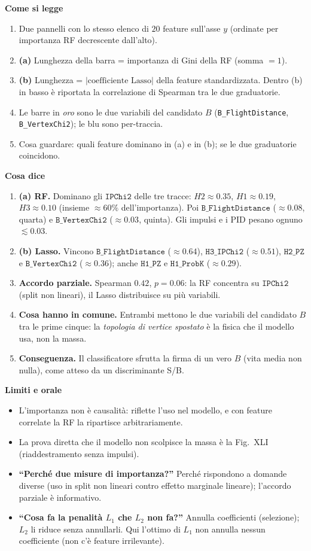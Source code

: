 \documentclass[10.5pt,a4paper]{article}
\newcommand{\sez}[1]{\par\Needspace{6\baselineskip}\medskip\noindent\textbf{\large #1}\par\nopagebreak\smallskip}
\begin{document}
\sez{Come si legge}
\begin{enumerate}
\item Due pannelli con lo stesso elenco di $20$ feature sull'asse $y$ (ordinate per importanza RF decrescente dall'alto).
\item \textbf{(a)} Lunghezza della barra = importanza di Gini della RF (somma $=1$).
\item \textbf{(b)} Lunghezza = $|\text{coefficiente Lasso}|$ della feature standardizzata. Dentro (b) in basso è riportata la correlazione di Spearman tra le due graduatorie.
\item Le barre in \emph{oro} sono le due variabili del candidato $B$ (\texttt{B\_FlightDistance}, \texttt{B\_VertexChi2}); le blu sono per-traccia.
\item Cosa guardare: quali feature dominano in (a) e in (b); se le due graduatorie coincidono.
\end{enumerate}

\sez{Cosa dice}
\begin{enumerate}
\item \textbf{(a) RF.} Dominano gli $\mathtt{IPChi2}$ delle tre tracce: $H2\approx0.35$, $H1\approx0.19$, $H3\approx0.10$ (insieme $\approx60\%$ dell'importanza). Poi $\mathtt{B\_FlightDistance}$ ($\approx0.08$, quarta) e $\mathtt{B\_VertexChi2}$ ($\approx0.03$, quinta). Gli impulsi e i PID pesano ognuno $\lesssim0.03$.
\item \textbf{(b) Lasso.} Vincono $\mathtt{B\_FlightDistance}$ ($\approx0.64$), $\mathtt{H3\_IPChi2}$ ($\approx0.51$), $\mathtt{H2\_PZ}$ e $\mathtt{B\_VertexChi2}$ ($\approx0.36$); anche $\mathtt{H1\_PZ}$ e $\mathtt{H1\_ProbK}$ ($\approx0.29$).
\item \textbf{Accordo parziale.} Spearman $0.42$, $p=0.06$: la RF concentra su $\mathtt{IPChi2}$ (split non lineari), il Lasso distribuisce su più variabili.
\item \textbf{Cosa hanno in comune.} Entrambi mettono le due variabili del candidato $B$ tra le prime cinque: la \emph{topologia di vertice spostato} è la fisica che il modello usa, non la massa.
\item \textbf{Conseguenza.} Il classificatore sfrutta la firma di un vero $B$ (vita media non nulla), come atteso da un discriminante S/B.
\end{enumerate}

\sez{Limiti e orale}
\begin{itemize}
\item L'importanza non è causalità: riflette l'uso nel modello, e con feature correlate la RF la ripartisce arbitrariamente.
\item La prova diretta che il modello non scolpisce la massa è la Fig.~XLI (riaddestramento senza impulsi).
\item \textbf{``Perché due misure di importanza?''} Perché rispondono a domande diverse (uso in split non lineari contro effetto marginale lineare); l'accordo parziale è informativo.
\item \textbf{``Cosa fa la penalità $L_1$ che $L_2$ non fa?''} Annulla coefficienti (selezione); $L_2$ li riduce senza annullarli. Qui l'ottimo di $L_1$ non annulla nessun coefficiente (non c'è feature irrilevante).
\end{itemize}
\end{document}
